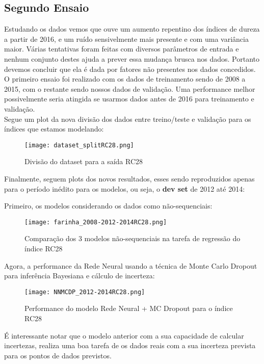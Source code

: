 \subsection{Segundo Ensaio}

Estudando os dados vemos que ouve um aumento repentino dos índices de dureza a
partir de 2016, e um ruído sensivelmente mais presente e com uma variância
maior. Várias tentativas foram feitas com diversos parâmetros de entrada e
nenhum conjunto destes ajuda a prever essa mudança brusca nos dados. Portanto
devemos concluir que ela é dada por fatores não presentes nos dados concedidos.
O primeiro ensaio foi realizado com os dados de treinamento sendo de 2008 a
2015, com o restante sendo nossos dados de validação. Uma performance melhor
possivelmente seria atingida se usarmos dados antes de 2016 para treinamento e
validação. \\  


Segue um plot da nova divisão dos dados entre treino/teste e validação para os índices que estamos modelando:


\begin{figure}[H]
\centering
\texttt{[image: dataset\_splitRC28.png]}
\caption{Divisão do dataset para a saída RC28}
\end{figure}


Finalmente, seguem plots dos novos resultados, esses sendo reproduzidos apenas para o período inédito para os modelos, ou seja, o \textbf{dev set} de 2012 até 2014:

Primeiro, os modelos considerando os dados como não-sequenciais:

\begin{figure}[H]
\centering
\texttt{[image: farinha\_2008-2012-2014RC28.png]}
\caption{Comparação dos 3 modelos não-sequenciais na tarefa de regressão do índice RC28}
\end{figure}


Agora, a performance da Rede Neural usando a técnica de Monte Carlo Dropout para inferência Bayesiana e cálculo de incerteza:


\begin{figure}[H]
\centering
\texttt{[image: NNMCDP\_2012-2014RC28.png]}
\caption{Performance do modelo Rede Neural + MC Dropout para o índice RC28}
\end{figure}


É interessante notar que o modelo anterior com a sua capacidade de calcular incertezas, realiza uma boa tarefa de  os dados reais com a sua incerteza prevista para os pontos de dados previstos. \\ 

